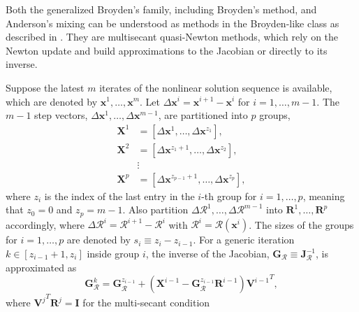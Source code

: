           Both the generalized Broyden's family, including Broyden's method, and Anderson's mixing can be understood as methods in the Broyden-like class as described in \cite{fang_two_2009}.
          They are multisecant quasi-Newton methods, which rely on the Newton update and build approximations to the Jacobian or directly to its inverse.

          Suppose the latest \(m\) iterates of the nonlinear solution sequence is available, which are denoted by \(\mathbf{x}^{1}, \ldots, \mathbf{x}^{m}\).
          Let \(\Delta \mathbf{x}^{i}=\mathbf{x}^{i+1}- \mathbf{x}^{i}\) for \(i=1, \ldots, m-1\).
          The $m-1$ step vectors, \(\Delta \mathbf{x}^{1}, \ldots, \Delta \mathbf{x}^{m-1}\), are partitioned into \(p\) groups,
          \begin{align}
            \mathbf{X}^{1} & =\left[\Delta \mathbf{x}^{1}, \ldots, \Delta \mathbf{x}^{z_{1}}\right], \\
            \mathbf{X}^{2} & =\left[\Delta \mathbf{x}^{z_{1}+1}, \ldots, \Delta \mathbf{x}^{z_{2}}\right],\\
                           & \vdots \\
            \mathbf{X}^{p} & =\left[\Delta \mathbf{x}^{z_{p-1}+1}, \ldots, \Delta \mathbf{x}^{z_{p}}\right],
          \end{align}
          where \(z_{i}\) is the index of the last entry in the \(i\)-th group for \(i=1, \ldots, p\), meaning that \(z_{0}=0\) and \(z_{p}=m-1\).
          Also partition \(\Delta \bm{\mathcal{R}}^{1}, \ldots, \Delta \bm{\mathcal{R}}^{m-1}\) into \(\mathbf R^{1}, \ldots, \mathbf R^p\) accordingly, where \(\Delta \bm{\mathcal{R}}^{i}=\bm{\mathcal{R}}^{i+1}- \bm{\mathcal{R}}^{i}\) with \(\bm{\mathcal{R}}^{i}=\bm{\mathcal{R}}(\mathbf{x}^{i})\).
          The sizes of the groups for \(i=1, \ldots, p\) are denoted by \(s_{i}\equiv z_{i}-z_{i-1}\).
          For a generic iteration $k\in[z_{i-1}+1, z_{i}]$ inside group $i$, the inverse of the Jacobian, \(\mathbf{G}_{\bm{\mathcal{R}}}\equiv \bm{\mathbf{J}}_{\bm{\mathcal{R}}}^{-1}\), is approximated as
          \begin{equation} \label{sec:broyden_like_class_g_update}
            \mathbf{G}_{\bm{\mathcal{R}}}^{k} = \mathbf{G}_{\bm{\mathcal{R}}}^{z_{i-1}}+\left(\mathbf{X}^{i-1}-\mathbf{G}_{\bm{\mathcal{R}}}^{z_{i-1}} \mathbf R^{i-1}\right) {\mathbf{V}^{i-1}}^T,
          \end{equation}
          where \({\mathbf{V}^{j}}^T \mathbf{R}^{j}=\mathbf{I}\) for the multi-secant condition

